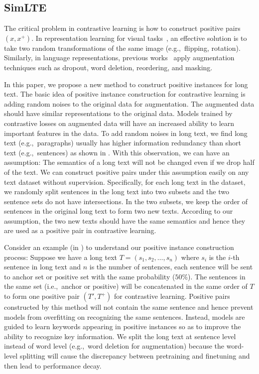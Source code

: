 \documentclass[11pt]{article}
\newcommand{\todo}[1]{{\color{red}{#1}}}
\begin{document}
\subsection{SimLTE}
The critical problem in contrastive learning is how to construct positive pairs $(x, x^{+})$.
In representation learning for visual tasks~\cite{Chen2020ASF}, an effective solution is to take two random transformations of the same image (e.g.,~flipping, rotation).
Similarly, in language representations, previous works~\cite{Gao2021SimCSESC, Karpukhin2020DensePR, Meng2021COCOLMCA, Li2022UCTopicUC} apply augmentation techniques such as dropout, word deletion, reordering, and masking.

In this paper, we propose a new method to construct positive instances for long text. 
The basic idea of positive instance construction for contrastive learning is adding random noises to the original data for augmentation. 
The augmented data should have similar representations to the original data. 
Models trained by contrastive losses on augmented data will have an increased ability to learn important features in the data.
To add random noises in long text, we find long text (e.g.,~paragraphs) usually has higher information redundancy than short text (e.g.,~sentences) as shown in \todo{Table}. With this observation, we can have an assumption: 
The semantics of a long text will not be changed even if we drop half of the text. 
We can construct positive pairs under this assumption easily on any text dataset without supervision.
Specifically, for each long text in the dataset, we randomly split sentences in the long text into two subsets and the two sentence sets do not have intersections. 
In the two subsets, we keep the order of sentences in the original long text to form two new texts. 
According to our assumption, the two new texts should have the same semantics and hence they are used as a positive pair in contrastive learning. 

Consider an example (in \todo{Figure}) to understand our positive instance construction process:
Suppose we have a long text $T = (s_1, s_2,\dots,s_n)$ where $s_i$ is the $i$-th sentence in long text and $n$ is the number of sentences, each sentence will be sent to anchor set or positive set with the same probability ($50\%$). 
The sentences in the same set (i.e.,~anchor or positive) will be concatenated in the same order of $T$ to form one positive pair $(T', T^+)$ for contrastive learning. 
Positive pairs constructed by this method will not contain the same sentence and hence prevent models from overfitting on recognizing the same sentences. 
Instead, models are guided to learn keywords appearing in positive instances so as to improve the ability to recognize key information. 
We split the long text at sentence level instead of word level (e.g.,~word deletion for augmentation) because the word-level splitting will cause the discrepancy between pretraining and finetuning and then lead to performance decay.
\end{document}
